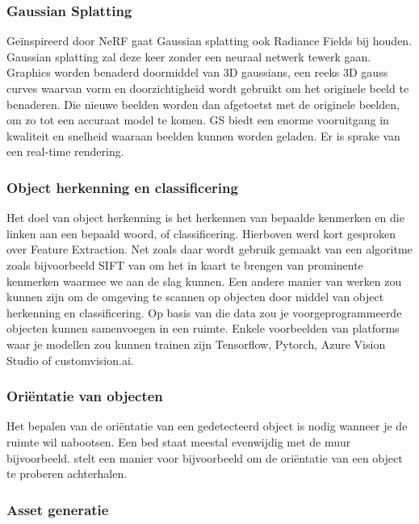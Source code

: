 \subsubsection{Gaussian Splatting}

Geïnspireerd door NeRF gaat Gaussian splatting ook Radiance Fields bij houden. Gaussian splatting zal deze keer zonder een neuraal netwerk tewerk gaan. Graphics worden benaderd doormiddel van 3D gaussians, een reeks 3D gauss curves waarvan vorm en doorzichtigheid wordt gebruikt om het originele beeld te benaderen. Die nieuwe beelden worden dan afgetoetst met de originele beelden, om zo tot een accuraat model te komen.
GS biedt een enorme vooruitgang in kwaliteit en snelheid waaraan beelden kunnen worden geladen. Er is sprake van een real-time rendering. \autocite{Kerbl2023}


\subsubsection{Object herkenning en classificering}

Het doel van object herkenning is het herkennen van bepaalde kenmerken en die linken aan een bepaald woord, of classificering. Hierboven werd kort gesproken over Feature Extraction. Net zoals daar wordt gebruik gemaakt van een algoritme zoals bijvoorbeeld SIFT van \textcite{Schonberger2016} om het in kaart te brengen van prominente kenmerken waarmee we aan de slag kunnen. 
Een andere manier van werken zou kunnen zijn om de omgeving te scannen op objecten door middel van object herkenning en classificering. Op basis van die data zou je voorgeprogrammeerde objecten kunnen samenvoegen in een ruimte. 
Enkele voorbeelden van platforms waar je modellen zou kunnen trainen zijn Tensorflow, Pytorch, Azure Vision Studio of customvision.ai. 

\subsubsection{Oriëntatie van objecten}

Het bepalen van de oriëntatie van een gedetecteerd object is nodig wanneer je de ruimte wil nabootsen. Een bed staat meestal evenwijdig met de muur bijvoorbeeld. \textcite{Saxena2009} stelt een manier voor bijvoorbeeld om de oriëntatie van een object te proberen achterhalen.

\subsubsection{Asset generatie}

